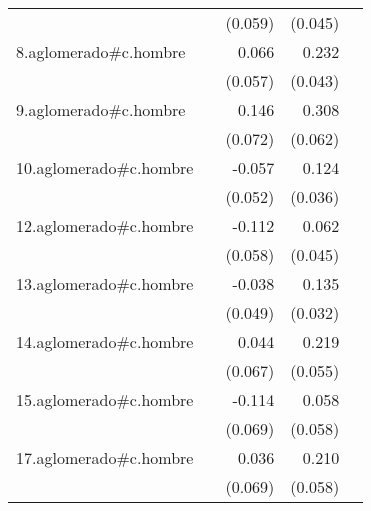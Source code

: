 {\begin{longtable}{l*{4}{D{.}{.}{-1}}}
            &                     &     (0.059)         &     (0.045)         &                     \\
\addlinespace
8.aglomerado#c.hombre&                     &       0.066         &       0.232\sym{***}&                     \\
            &                     &     (0.057)         &     (0.043)         &                     \\
\addlinespace
9.aglomerado#c.hombre&                     &       0.146\sym{*}  &       0.308\sym{***}&                     \\
            &                     &     (0.072)         &     (0.062)         &                     \\
\addlinespace
10.aglomerado#c.hombre&                     &      -0.057         &       0.124\sym{***}&                     \\
            &                     &     (0.052)         &     (0.036)         &                     \\
\addlinespace
12.aglomerado#c.hombre&                     &      -0.112         &       0.062         &                     \\
            &                     &     (0.058)         &     (0.045)         &                     \\
\addlinespace
13.aglomerado#c.hombre&                     &      -0.038         &       0.135\sym{***}&                     \\
            &                     &     (0.049)         &     (0.032)         &                     \\
\addlinespace
14.aglomerado#c.hombre&                     &       0.044         &       0.219\sym{***}&                     \\
            &                     &     (0.067)         &     (0.055)         &                     \\
\addlinespace
15.aglomerado#c.hombre&                     &      -0.114         &       0.058         &                     \\
            &                     &     (0.069)         &     (0.058)         &                     \\
\addlinespace
17.aglomerado#c.hombre&                     &       0.036         &       0.210\sym{***}&                     \\
            &                     &     (0.069)         &     (0.058)         &                     \\

\end{longtable}}
